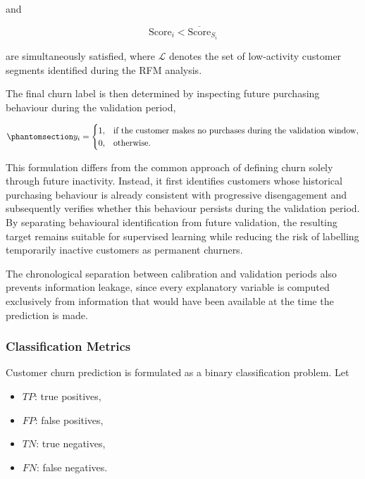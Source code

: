 \documentclass[
  12pt,
  letterpaper,
]{book}
\providecommand{\tightlist}{%
  \setlength{\itemsep}{0pt}\setlength{\parskip}{0pt}}
\begin{document}
and

\[
\mathrm{Score}_i<
\overline{\mathrm{Score}}_{S_i}
\]

are simultaneously satisfied, where \(\mathcal{L}\) denotes the set of
low-activity customer segments identified during the RFM analysis.

The final churn label is then determined by inspecting future purchasing
behaviour during the validation period,

\begin{equation}\phantomsection\label{eq-churn-definition}{
y_i=
\begin{cases}
1, & \text{if the customer makes no purchases during the validation window},\\
0, & \text{otherwise}.
\end{cases}
}\end{equation}

This formulation differs from the common approach of defining churn
solely through future inactivity. Instead, it first identifies customers
whose historical purchasing behaviour is already consistent with
progressive disengagement and subsequently verifies whether this
behaviour persists during the validation period. By separating
behavioural identification from future validation, the resulting target
remains suitable for supervised learning while reducing the risk of
labelling temporarily inactive customers as permanent churners.

The chronological separation between calibration and validation periods
also prevents information leakage, since every explanatory variable is
computed exclusively from information that would have been available at
the time the prediction is made.

\subsubsection{Classification Metrics}\label{classification-metrics}

Customer churn prediction is formulated as a binary classification
problem. Let

\begin{itemize}
\tightlist
\item
  \(TP\): true positives,
\item
  \(FP\): false positives,
\item
  \(TN\): true negatives,
\item
  \(FN\): false negatives.
\end{itemize}
\end{document}

